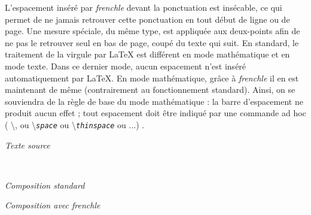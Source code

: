 \documentclass[a4paper,12pt,openright]{article}
\begin{document}
L’espacement inséré par \textit{frenchle} devant la ponctuation est insécable, ce qui
permet de ne jamais retrouver cette ponctuation en tout début de ligne ou de
page. Une mesure spéciale, du même type, est appliquée aux deux-points afin
de ne pas le retrouver seul en bas de page, coupé du texte qui suit.
En standard, le traitement de la virgule par \LaTeX{} est différent en mode
mathématique et en mode texte. Dans ce dernier mode, aucun espacement n’est
inséré automatiquement par \LaTeX. En mode mathématique, grâce à \textit{frenchle}
il en est maintenant de même (contrairement au fonctionnement standard).
Ainsi, on se souviendra de la règle de base du mode mathématique : la barre
d’espacement ne produit aucun effet ; tout espacement doit être indiqué par une
commande ad hoc ( \backslash, 
ou \backslash\texttt{\textit{space}}  
ou  \backslash\texttt{\textit{thinspace}} ou ...) .


\begin{center}
\textit{Texte source}\\[1ex]
\\[0.3ex]
\begin{minipage}{70mm}
\begin{center}
\textit{Composition standard}
\end{center}
\end{minipage}
\begin{minipage}{65mm}
\begin{center}
\textit{Composition avec frenchle}
\end{center}
\end{minipage}
\end{center}
\rule{0pt}{1em}
\end{document}
